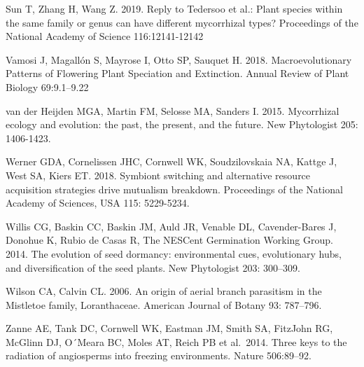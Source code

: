 \documentclass[12pt,]{article}
\begin{document}
Sun T, Zhang H, Wang Z. 2019. Reply to Tedersoo et al.: Plant species
within the same family or genus can have different mycorrhizal types?
Proceedings of the National Academy of Science 116:12141-12142

Vamosi J, Magallón S, Mayrose I, Otto SP, Sauquet H. 2018.
Macroevolutionary Patterns of Flowering Plant Speciation and Extinction.
Annual Review of Plant Biology 69:9.1--9.22

van der Heijden MGA, Martin FM, Selosse MA, Sanders I. 2015. Mycorrhizal
ecology and evolution: the past, the present, and the future. New
Phytologist 205: 1406-1423.

Werner GDA, Cornelissen JHC, Cornwell WK, Soudzilovskaia NA, Kattge J,
West SA, Kiers ET. 2018. Symbiont switching and alternative resource
acquisition strategies drive mutualism breakdown. Proceedings of the
National Academy of Sciences, USA 115: 5229-5234.

Willis CG, Baskin CC, Baskin JM, Auld JR, Venable DL, Cavender-Bares J,
Donohue K, Rubio de Casas R, The NESCent Germination Working Group.
2014. The evolution of seed dormancy: environmental cues, evolutionary
hubs, and diversification of the seed plants. New Phytologist 203:
300--309.

Wilson CA, Calvin CL. 2006. An origin of aerial branch parasitism in the
Mistletoe family, Loranthaceae. American Journal of Botany 93: 787--796.

Zanne AE, Tank DC, Cornwell WK, Eastman JM, Smith SA, FitzJohn RG,
McGlinn DJ, O´Meara BC, Moles AT, Reich PB et al.~2014. Three keys to
the radiation of angiosperms into freezing environments. Nature
506:89--92.
\end{document}
